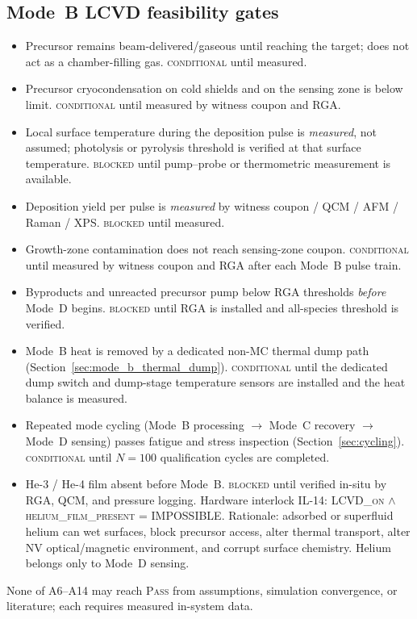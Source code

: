\documentclass[12pt,a4paper]{article}
\newcommand{\blocked}{\textsc{blocked}}
\newcommand{\conditional}{\textsc{conditional}}
\begin{document}
\subsection*{Mode~B LCVD feasibility gates}
\begin{itemize}[noitemsep]
  \item[A6] Precursor remains beam-delivered/gaseous until reaching the target;
        does not act as a chamber-filling gas. \conditional{} until measured.
  \item[A7] Precursor cryocondensation on cold shields and on the sensing zone
        is below limit. \conditional{} until measured by witness coupon and RGA.
  \item[A8] Local surface temperature during the deposition pulse is
        \emph{measured}, not assumed; photolysis or pyrolysis threshold is
        verified at that surface temperature. \blocked{} until pump--probe or
        thermometric measurement is available.
  \item[A9] Deposition yield per pulse is \emph{measured} by witness coupon /
        QCM / AFM / Raman / XPS. \blocked{} until measured.
  \item[A10] Growth-zone contamination does not reach sensing-zone coupon.
        \conditional{} until measured by witness coupon and RGA after each
        Mode~B pulse train.
  \item[A11] Byproducts and unreacted precursor pump below RGA thresholds
        \emph{before} Mode~D begins. \blocked{} until RGA is installed and
        all-species threshold is verified.
  \item[A12] Mode~B heat is removed by a dedicated non-MC thermal dump path
        (Section~\ref{sec:mode_b_thermal_dump}). \conditional{} until the
        dedicated dump switch and dump-stage temperature sensors are installed
        and the heat balance is measured.
  \item[A13] Repeated mode cycling (Mode~B processing $\rightarrow$ Mode~C recovery $\rightarrow$ Mode~D sensing) passes fatigue and stress inspection
        (Section~\ref{sec:cycling}). \conditional{} until $N=100$ qualification
        cycles are completed.
  \item[A14] He-3 / He-4 film absent before Mode~B. \blocked{} until verified
        in-situ by RGA, QCM, and pressure logging. Hardware interlock IL-14:
        \textsc{LCVD\_on} $\wedge$ \textsc{helium\_film\_present} = IMPOSSIBLE.
        Rationale: adsorbed or superfluid helium can wet surfaces, block
        precursor access, alter thermal transport, alter NV optical/magnetic
        environment, and corrupt surface chemistry. Helium belongs only to
        Mode~D sensing.
\end{itemize}
None of A6--A14 may reach \textsc{Pass} from assumptions, simulation
convergence, or literature; each requires measured in-system data.
\end{document}
